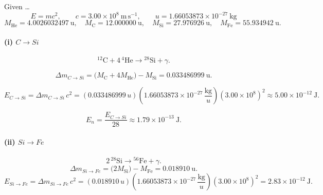 \documentclass{article}
\begin{document}


Given \dots
\[
E = mc^2,\qquad c = 3.00\times10^8\ \mathrm{m\,s^{-1}},\qquad
u = 1.66053873\times10^{-27}\ \mathrm{kg}
\]
\[
M_{\mathrm{He}} = 4.0026032497\ \mathrm{u},\quad
M_{\mathrm{C}} = 12.000000\ \mathrm{u},\quad
M_{\mathrm{Si}} = 27.976926\ \mathrm{u},\quad
M_{\mathrm{Fe}} = 55.934942\ \mathrm{u}.
\]

\paragraph{(i) \textbf{\(C \rightarrow Si\)}}

\[
^{12}\mathrm{C} + 4\,^{4}\mathrm{He} \rightarrow {}^{28}\mathrm{Si} + \gamma .
\]

\[
\Delta m_{C\to Si}
= \big(M_{\mathrm{C}} + 4 M_{\mathrm{He}}\big) - M_{\mathrm{Si}}
= 0.033486999\ \mathrm{u}.
\]

\[
E_{C\to Si} = \Delta m_{C\to Si}\,c^2
= \left(0.033486999\,u\right)\left(1.66053873\times10^{-27}\,\frac{\mathrm{kg}}{u}\right)
(3.00\times10^{8})^{2}
\approx 5.00\times10^{-12}\ \mathrm{J}.
\]

\[
\boxed{
   E_n = \frac{E_{C\to Si}}{28} \approx 1.79\times10^{-13}\ \mathrm{J}.
   }
\]

\paragraph{(ii) \(Si \rightarrow Fe\)}

\[
2\,^{28}\mathrm{Si} \rightarrow {}^{56}\mathrm{Fe} + \gamma .
\]
\[
\Delta m_{Si\to Fe} = \big(2 M_{\mathrm{Si}}\big) - M_{\mathrm{Fe}}
= 0.018910\ \mathrm{u}.
\]
\[
E_{Si\to Fe} = \Delta m_{Si\to Fe}\,c^2
= \left(0.018910\,u\right)\left(1.66053873\times10^{-27}\,\frac{\mathrm{kg}}{u}\right)
(3.00\times10^{8})^{2}
= 2.83\times10^{-12}\ \mathrm{J}.
\]
\end{document}
